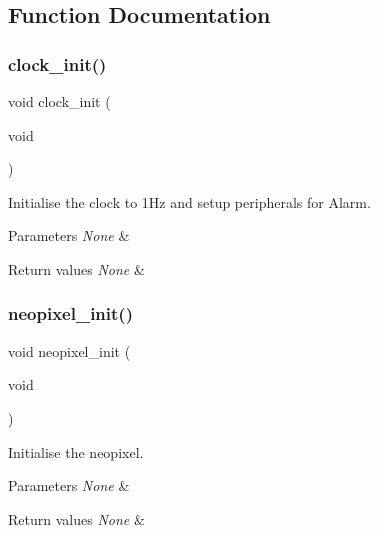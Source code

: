 \subsection{Function Documentation}
\mbox{\label{group___initialisation_ga78ab77b57cf2e00089f0a3a22508524c}} 
\subsubsection{\texorpdfstring{clock\+\_\+init()}{clock\_init()}}
{\footnotesize\ttfamily void clock\+\_\+init (\begin{DoxyParamCaption}\item[{void}]{ }\end{DoxyParamCaption})}



Initialise the clock to 1\+Hz and setup peripherals for Alarm. 


\begin{DoxyParams}{Parameters}
{\em None} & \\
\hline
\end{DoxyParams}

\begin{DoxyRetVals}{Return values}
{\em None} & \\
\hline
\end{DoxyRetVals}
\mbox{\label{group___initialisation_gaac78468985e44a3e4d353ea9276b33bc}} 
\subsubsection{\texorpdfstring{neopixel\+\_\+init()}{neopixel\_init()}}
{\footnotesize\ttfamily void neopixel\+\_\+init (\begin{DoxyParamCaption}\item[{void}]{ }\end{DoxyParamCaption})}



Initialise the neopixel. 


\begin{DoxyParams}{Parameters}
{\em None} & \\
\hline
\end{DoxyParams}

\begin{DoxyRetVals}{Return values}
{\em None} & \\
\hline
\end{DoxyRetVals}

